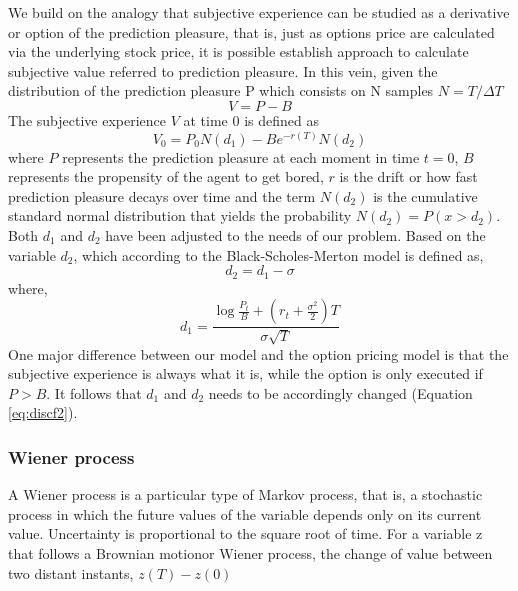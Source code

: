 \documentclass[11pt, onecolumn]{article}
\begin{document}
We build on the analogy that subjective experience can be studied as a derivative or option of the prediction pleasure, that is, just as options price are calculated via the underlying stock price, it is possible establish approach to calculate subjective value referred to prediction pleasure. 
In this vein, given the distribution of the prediction pleasure P which consists on N samples $N = T / \Delta T$
\begin{equation}
V = P - B 
\label{eq:bsmadap1ap}
\end{equation}  
The subjective experience $V$ at time 0 is defined as 
\begin{equation}
V_0 =P_0 N(d_1)  - B e^ {-r(T)}N(d_2)
\label{eq:bsmadap2ap}
\end{equation}
where $P$ represents the prediction pleasure at each moment in time $t=0$, $B$ represents the propensity of the agent to get bored, $r$ is the drift or how fast prediction pleasure decays over time and the term $N(d_2)$ is the cumulative standard normal distribution that yields the probability $N(d_2) = P(x > d_2)$. Both $d_1$ and $d_2$ have been  adjusted to the needs of our problem. 
Based on the variable $d_2$, which according to the Black-Scholes-Merton model is defined as, 
\begin{equation}
 d_2 = d_1 - \sigma
\label{eq:instbsmd22}
\end{equation}
 where, 
 \begin{equation}
 d_1 =  \frac{\log \frac{P_t}{B} + (r_t + \frac{\sigma^2}{2})T} {\sigma \sqrt T}
 \label{eq:bsmd31}
 \end{equation} 
One major difference between our model and the option pricing model is that the subjective experience is always what it is, while the option is only executed if $P>B$. It follows that $d_1$ and $d_2$ needs to be accordingly changed (Equation \ref{eq:discf2}).


\subsubsection*{Wiener process}
A Wiener process is a particular type of Markov process, that is, a stochastic process in which the future values of the variable depends only on its current value. Uncertainty is proportional to the square root of time. For a variable z that follows a Brownian motionor Wiener process, the change of value between two distant instants, $z(T) - z(0)$

 
\end{document}
